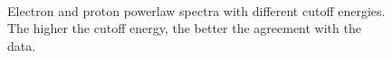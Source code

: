 \documentclass[a4paper]{article}
\begin{document}
\begin{figure}[h]
{\begin{subfigure}[b]{.65\textwidth}
	\end{subfigure}%
	}\\
\caption{Electron and proton powerlaw spectra with different cutoff energies. The higher the cutoff energy, the better the agreement with the data.}
\label{Cutoff_energies}
\end{figure}
\end{document}
